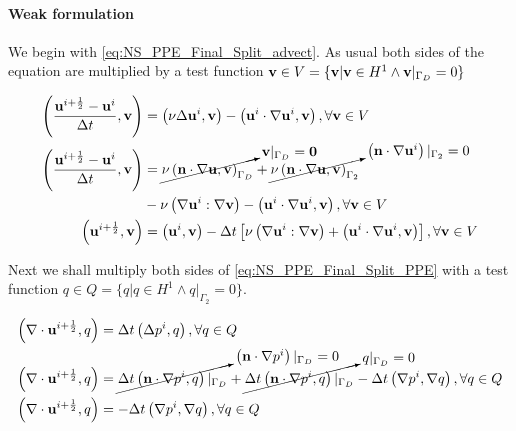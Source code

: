 \paragraph{Weak formulation}
We begin with \cref{eq:NS_PPE_Final_Split_advect}. As usual both sides of the equation are multiplied by a test function $\mathbf{v} \in V = \{\mathbf{v} \vert \mathbf{v} \in H^1 \land \mathbf{v}|_{\Gamma_D} = 0\}$

\begin{align*}
	\left(\frac{\mathbf{u}^{i + \frac{1}{2}} - \mathbf{u}^{i}}{\Delta t}, \mathbf{v}\right) &= \left(\nu\Delta\mathbf{u}^i, \mathbf{v}\right) - \left(\mathbf{u}^i \cdot \nabla\mathbf{u}^i, \mathbf{v}\right), \forall\mathbf{v} \in V \\
	\left(\frac{\mathbf{u}^{i + \frac{1}{2}} - \mathbf{u}^{i}}{\Delta t}, \mathbf{v}\right) &= \cancelto{\mathbf{v}|_{\Gamma_D} = \mathbf{0}}{\nu\left(\mathbf{n} \cdot \nabla\mathbf{u}, \mathbf{v}\right)_{\Gamma_D}} + \cancelto{\left(\mathbf{n} \cdot \nabla\mathbf{u}^i\right)|_{\Gamma_2} = 0}{\nu\left(\mathbf{n} \cdot \nabla\mathbf{u}, \mathbf{v}\right)_{\Gamma_2}}  \\&- \nu\left(\nabla\mathbf{u}^i : \nabla\mathbf{v}\right) - \left(\mathbf{u}^i \cdot \nabla\mathbf{u}^i, \mathbf{v}\right), \forall\mathbf{v} \in V \\
	\left(\mathbf{u}^{i + \frac{1}{2}}, \mathbf{v}\right) &= \left(\mathbf{u}^i, \mathbf{v}\right) - \Delta t \left[\nu\left(\nabla\mathbf{u}^i : \nabla\mathbf{v}\right) + \left(\mathbf{u}^i \cdot \nabla\mathbf{u}^i, \mathbf{v}\right)\right], \forall\mathbf{v} \in V \\
\end{align*}

Next we shall multiply both sides of \cref{eq:NS_PPE_Final_Split_PPE} with a test function $q \in Q = \{q\vert q \in H^1 \land q|_{\Gamma_2} = 0\}$.

\begin{align*}
	\left(\nabla\cdot\mathbf{u}^{i + \frac{1}{2}}, q\right) &= \Delta t\left(\Delta p^i, q\right), \forall q \in Q \\
	\left(\nabla\cdot\mathbf{u}^{i + \frac{1}{2}}, q\right) & = \cancelto{\left(\mathbf{n} \cdot \nabla p^i\right)|_{\Gamma_D} = 0}{\Delta t\left(\mathbf{n} \cdot \nabla p^i, q\right)\vert_{\Gamma_D}} + \cancelto{q|_{\Gamma_D} = 0}{\Delta t\left(\mathbf{n} \cdot \nabla p^i, q\right)\vert_{\Gamma_D}} - \Delta t \left(\nabla p^i, \nabla q\right), \forall q \in Q \\
	\left(\nabla\cdot\mathbf{u}^{i + \frac{1}{2}}, q\right) &= - \Delta t \left(\nabla p^i, \nabla q\right), \forall q \in Q
\end{align*}

